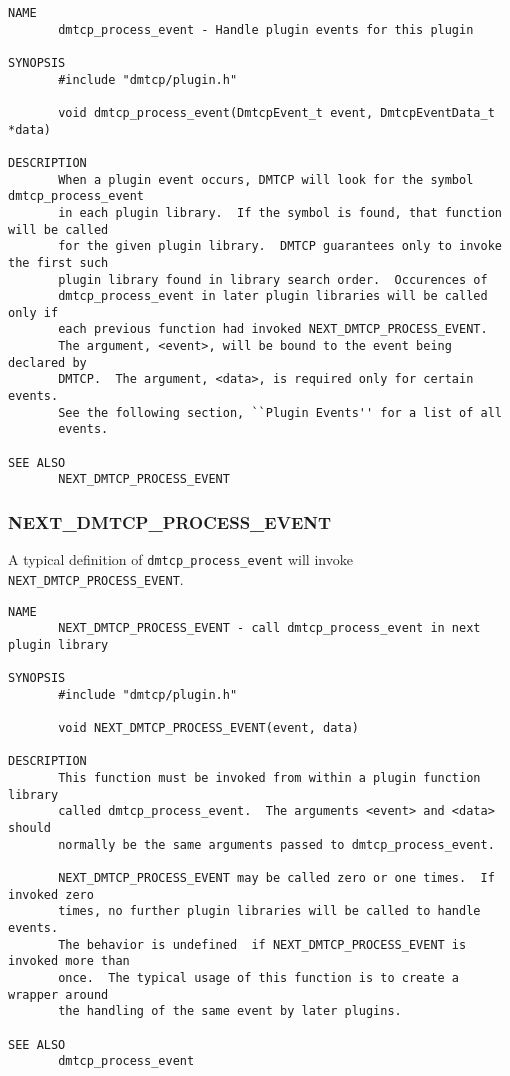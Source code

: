 \documentclass{article}
\begin{document}
\begin{verbatim}
NAME
       dmtcp_process_event - Handle plugin events for this plugin

SYNOPSIS
       #include "dmtcp/plugin.h"

       void dmtcp_process_event(DmtcpEvent_t event, DmtcpEventData_t *data)

DESCRIPTION
       When a plugin event occurs, DMTCP will look for the symbol dmtcp_process_event
       in each plugin library.  If the symbol is found, that function will be called
       for the given plugin library.  DMTCP guarantees only to invoke the first such
       plugin library found in library search order.  Occurences of
       dmtcp_process_event in later plugin libraries will be called only if
       each previous function had invoked NEXT_DMTCP_PROCESS_EVENT.
       The argument, <event>, will be bound to the event being declared by
       DMTCP.  The argument, <data>, is required only for certain events.
       See the following section, ``Plugin Events'' for a list of all
       events.

SEE ALSO
       NEXT_DMTCP_PROCESS_EVENT
\end{verbatim}

\subsubsection{NEXT\_DMTCP\_PROCESS\_EVENT}

A typical definition of {\tt dmtcp\_process\_event} will invoke
{\tt NEXT\_DMTCP\_PROCESS\_EVENT}.

\begin{verbatim}
NAME
       NEXT_DMTCP_PROCESS_EVENT - call dmtcp_process_event in next plugin library

SYNOPSIS
       #include "dmtcp/plugin.h"

       void NEXT_DMTCP_PROCESS_EVENT(event, data)

DESCRIPTION
       This function must be invoked from within a plugin function library
       called dmtcp_process_event.  The arguments <event> and <data> should
       normally be the same arguments passed to dmtcp_process_event.

       NEXT_DMTCP_PROCESS_EVENT may be called zero or one times.  If invoked zero
       times, no further plugin libraries will be called to handle events.
       The behavior is undefined  if NEXT_DMTCP_PROCESS_EVENT is invoked more than
       once.  The typical usage of this function is to create a wrapper around
       the handling of the same event by later plugins.

SEE ALSO
       dmtcp_process_event
\end{verbatim}
\end{document}
